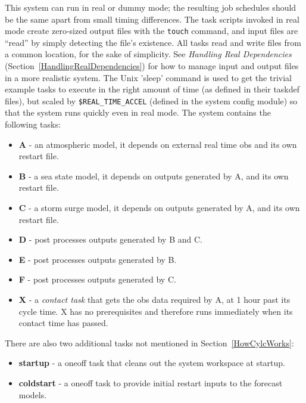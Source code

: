 

This system can run in real or dummy mode; the resulting job 
schedules should be the same apart from small timing differences.
The task scripts invoked in real mode create zero-sized output files
with the \lstinline=touch= command, and input files are ``read'' by
simply detecting the file's existence.  All tasks read and write files
from a common location, for the sake of simplicity. 
See {\em Handling Real Dependencies}
(Section~\ref{HandlingRealDependencies}) for how to manage input and
output files in a more realistic system. 
The Unix 'sleep' command is used to get the trivial example tasks to
execute in the right amount of time (as defined in their taskdef files),
but scaled by \lstinline=$REAL_TIME_ACCEL= 
(defined in the system config module)
so that the system runs quickly even in real mode.
The system contains the following tasks:

\begin{itemize}
    \item {\bf A} - an atmospheric model, it depends on external real
        time obs and its own restart file.
    \item {\bf B} - a sea state model, it depends on outputs generated
        by A, and its own restart file.
    \item {\bf C} - a storm surge model, it depends on outputs generated
        by A, and its own restart file.
    \item {\bf D} - post processes outputs generated by B and C.
    \item {\bf E} - post processes outputs generated by B.
    \item {\bf F} - post processes outputs generated by C.
    \item {\bf X} - a {\em contact task} that gets the obs data required
    by A, at 1 hour past its cycle time. X has no prerequisites and
    therefore runs immediately when its contact time has passed.
\end{itemize}

There are also two additional tasks not mentioned in Section~\ref{HowCylcWorks}:

\begin{itemize}
    \item {\bf startup} - a oneoff task that cleans out the system
    workspace at startup.
    \item {\bf coldstart} - a oneoff task to provide initial restart
        inputs to the forecast models. 
\end{itemize}

